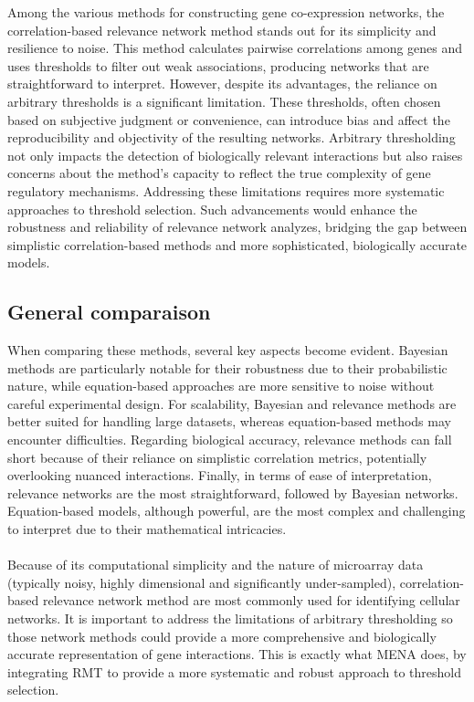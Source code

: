 Among the various methods for constructing gene co-expression networks, the correlation-based relevance network method stands out for its simplicity and resilience to noise\supercite{butte_discovering_2000}.
This method calculates pairwise correlations among genes and uses thresholds to filter out weak associations, producing networks that are straightforward to interpret\supercite{schmitt_elucidation_2004}.
However, despite its advantages, the reliance on arbitrary thresholds is a significant limitation.
These thresholds, often chosen based on subjective judgment or convenience, can introduce bias and affect the reproducibility and objectivity of the resulting networks\supercite{oldham_conservation_2006}.
Arbitrary thresholding not only impacts the detection of biologically relevant interactions but also raises concerns about the method’s capacity to reflect the true complexity of gene regulatory mechanisms\supercite{gardner_reverse-engineering_2005}.
Addressing these limitations requires more systematic approaches to threshold selection.
Such advancements would enhance the robustness and reliability of relevance network analyzes, bridging the gap between simplistic correlation-based methods and more sophisticated, biologically accurate models.

\newpage
\subsection{General comparaison}\label{subsec:general-comparaison}

When comparing these methods, several key aspects become evident.
Bayesian methods are particularly notable for their robustness due to their probabilistic nature, while equation-based approaches are more sensitive to noise without careful experimental design.
For scalability, Bayesian and relevance methods are better suited for handling large datasets, whereas equation-based methods may encounter difficulties.
Regarding biological accuracy, relevance methods can fall short because of their reliance on simplistic correlation metrics, potentially overlooking nuanced interactions.
Finally, in terms of ease of interpretation, relevance networks are the most straightforward, followed by Bayesian networks.
Equation-based models, although powerful, are the most complex and challenging to interpret due to their mathematical intricacies.
\\\\
Because of its computational simplicity and the nature of microarray data (typically noisy, highly dimensional and significantly under-sampled)\supercite{gardner_reverse-engineering_2005}, correlation-based relevance network method are most commonly used for identifying cellular networks.
It is important to address the limitations of arbitrary thresholding so those network methods could provide a more comprehensive and biologically accurate representation of gene interactions.
This is exactly what MENA does, by integrating RMT to provide a more systematic and robust approach to threshold selection.